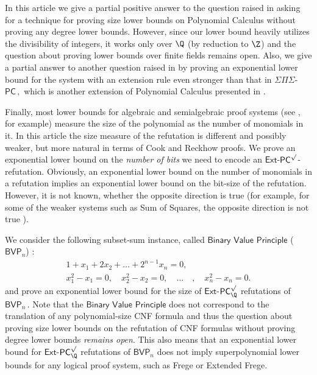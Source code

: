 \documentclass{toc}
\begin{document}
In this %
article  %
we give a partial positive answer to the question raised in \cite{IMP19_new} asking for a technique
for proving size lower bounds on Polynomial Calculus without proving any degree lower bounds. However,
since our lower bound heavily utilizes the divisibility of
%
integers,  %
it works only %
over  %
$\Q$ (by reduction to $\Z$) and the question about proving lower bounds over finite fields remains open.
Also, we give a partial answer to another question raised in \cite{IMP19_new} by proving an exponential lower bound for the system with an extension rule even stronger than that in $\Sigma\Pi\Sigma$-%
$\mathsf{PC}\,,$ %
which is another extension of Polynomial Calculus presented in %
%
%
%
\cite{IMP19_new}. 
%

%
%
%
%
%

Finally, most lower bounds for algebraic and semialgebraic proof systems (see  \cite{MR1691494,IPS99}, 
for example) measure the size of the polynomial as the number of monomials in it. In
this %
article  %
the size measure of the refutation is different and possibly weaker, but more natural in terms of Cook and Reckhow proofs. We prove an exponential lower bound on the \emph{number of bits} we need to encode an $\mathsf{Ext}$-$\mathsf{PC}^{\surd}$-refutation. Obviously, an exponential lower bound on the number of monomials in a refutation implies an exponential lower bound on the bit-size of the refutation. However, it is not known, whether
%
the opposite direction is true  %
(for example, for some of the weaker systems such as Sum of Squares,
%
the opposite direction  %
%
is not true \cite{odonnell:LIPIcs:2017:8198, Raghavendra2017OnTB, 10.1109/LICS52264.2021.9470545}).    


We consider the following subset-sum instance, called $\mathsf{Binary}$ $\mathsf{Value}$ $\mathsf{Principle}$ ($\mathsf{BVP}_n$) \cite{AGHT19_new,PT18_new}:
\begin{align*}
1 + x_1 + 2 x_2 + \ldots + 2^{n - 1} x_n = 0, \\
x_1^2 - x_1 = 0, \quad x_2^2 - x_2 = 0, \quad \ldots \quad, \quad x_n^2 - x_n = 0.
\end{align*}
and prove an exponential lower bound for the size of $\mathsf{Ext}$-$\mathsf{PC}_{\Q}^{\surd}$ refutations of %
$\mathsf{BVP}_n\,.$ %
 Note that the $\mathsf{Binary}$ $\mathsf{Value}$ $\mathsf{Principle}$ does not correspond to the translation of any %
polynomial-size CNF formula %
%
%
and thus the question about proving size lower %
bounds %
on the refutation of %
CNF formulas %
without proving degree lower bounds \emph{remains open}. This also means that
an  %
exponential lower bound for $\mathsf{Ext}$-$\mathsf{PC}_{\Q}^{\surd}$ refutations of $\mathsf{BVP}_n$ does not imply
%
superpolynomial 
%
lower bounds for any logical proof system, such as Frege or Extended Frege.
%
\end{document}
